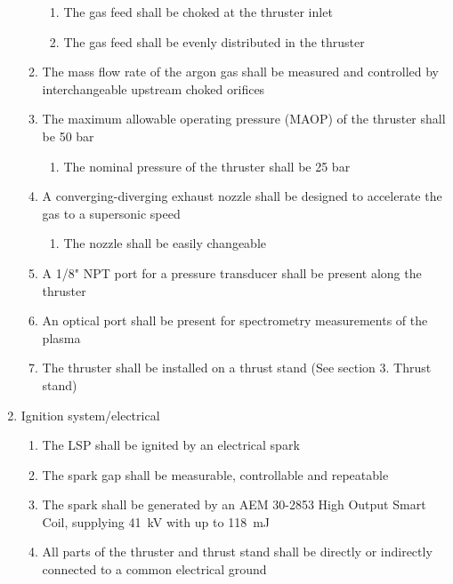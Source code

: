 \begin{enumerate}
\begin{enumerate}
                    \begin{enumerate}
                        \item The gas feed shall be choked at the thruster inlet
                        \item The gas feed shall be evenly distributed in the thruster
                    \end{enumerate}
                    \item The mass flow rate of the argon gas shall be measured and controlled by interchangeable upstream choked orifices
                    \item The maximum allowable operating pressure (MAOP) of the thruster shall be 50 bar
                    \begin{enumerate}
                        \item The nominal pressure of the thruster shall be 25 bar
                    \end{enumerate}
                    \item A converging-diverging exhaust nozzle shall be designed to accelerate the gas to a supersonic speed
                    \begin{enumerate}
                        \item The nozzle shall be easily changeable
                    \end{enumerate}
                    \item A 1/8" NPT port for a pressure transducer shall be present along the thruster
                    \item An optical port shall be present for spectrometry measurements of the plasma
                    \item The thruster shall be installed on a thrust stand (See section 3. Thrust stand)
                \end{enumerate}
                \item Ignition system/electrical
                \begin{enumerate}
                    \item The LSP shall be ignited by an electrical spark
                    \item The spark gap shall be measurable, controllable and repeatable
                    \item The spark shall be generated by an AEM 30-2853 High Output Smart Coil, supplying \qty{41}{kV} with up to \qty{118}{mJ}
                    \item All parts of the thruster and thrust stand shall be directly or indirectly connected to a common electrical ground

\end{enumerate}
\end{enumerate}
